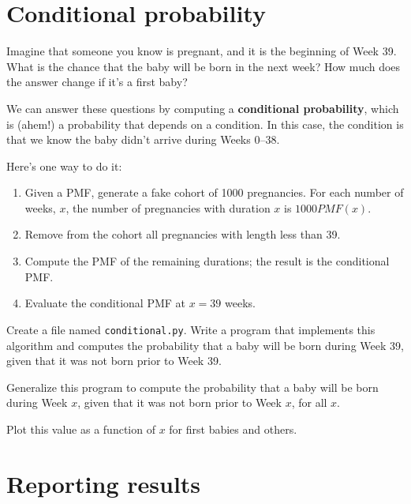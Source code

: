 \documentclass[10pt]{book}
\begin{document}
\section{Conditional probability}

Imagine that someone you know is pregnant, and it is the beginning of
Week 39.  What is the chance that the baby will be born in the next
week?  How much does the answer change if it's a first baby?

We can answer these questions by computing a {\bf conditional
probability}, which is (ahem!) a probability that depends on a condition.
In this case, the condition is that we know the baby didn't arrive
during Weeks 0--38.

Here's one way to do it:

\begin{enumerate}

\item Given a PMF, generate a fake cohort of 1000 pregnancies.
For each number of weeks, $x$, the number of pregnancies with
duration $x$ is $1000 PMF(x)$.

\item Remove from the cohort all pregnancies with length less than 39.

\item Compute the PMF of the remaining durations; the result is the
conditional PMF.

\item Evaluate the conditional PMF at $x = 39$ weeks.

\end{enumerate}

\begin{ex}
Create a file named {\tt conditional.py}.
Write a program that implements this algorithm and computes the
probability that a baby will be born during Week 39, given that
it was not born prior to Week 39.

Generalize this program to compute the
probability that a baby will be born during Week $x$, given that
it was not born prior to Week $x$, for all $x$.

Plot this value as a function of $x$ for first babies and others.

\end{ex}


\section{Reporting results}
\end{document}
